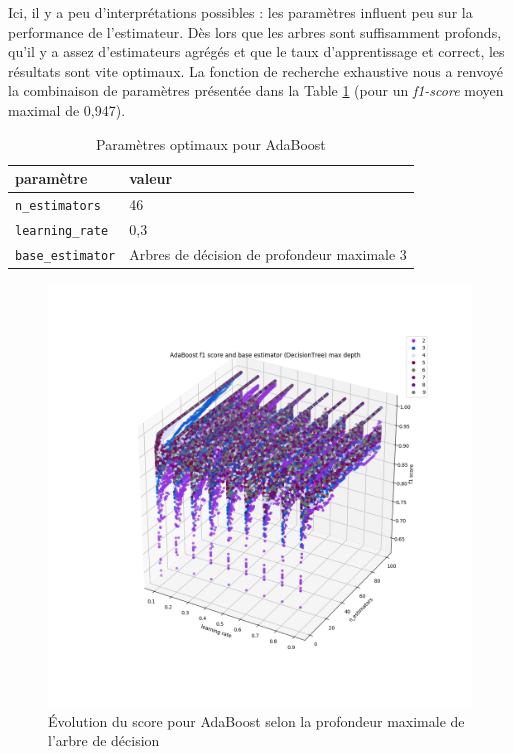 \documentclass[a4paper]{report}
\begin{document}
Ici, il y a peu d'interprétations possibles : les paramètres influent peu sur la performance de l'estimateur. Dès lors que les arbres sont suffisamment profonds, qu'il y a assez d'estimateurs agrégés et que le taux d'apprentissage et correct, les résultats sont vite optimaux. La fonction de recherche exhaustive nous a renvoyé la combinaison de paramètres présentée dans la Table \ref{best_params_ada} (pour un \emph{f1-score} moyen maximal de 0,947).

\begin{table}
\centering
\begin{tabular}{ll}
paramètre & valeur \\
\hline
\texttt{n\_estimators} & 46 \\
\texttt{learning\_rate} & 0,3 \\
\texttt{base\_estimator} & Arbres de décision de profondeur maximale 3\\
\end{tabular}
\caption{Paramètres optimaux pour AdaBoost\label{best_params_ada}}
\end{table}

\begin{figure}
\centering
\includegraphics[width=\textwidth]{img/adaboost_depth.png}
\caption{Évolution du score pour AdaBoost selon la profondeur maximale de l'arbre de décision\label{adaboost_depth}}
\end{figure}
\end{document}
